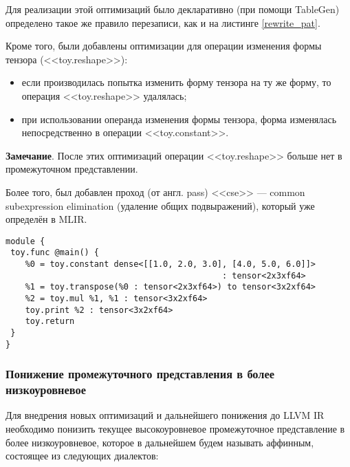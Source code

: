 Для реализации этой оптимизаций было декларативно (при помощи TableGen) определено такое же правило перезаписи, как и на листинге \ref{rewrite_pat}.

Кроме того, были добавлены оптимизации для операции изменения формы тензора (<<toy.reshape>>):

\begin{itemize}
	\item если производилась попытка изменить форму тензора на ту же форму, то операция <<toy.reshape>> удалялась;
	\item при использовании операнда изменения формы тензора, форма изменялась непосредственно в операции <<toy.constant>>.
\end{itemize}

\textbf{Замечание}.
После этих оптимизаций операции <<toy.reshape>> больше нет в промежуточном представлении.

Более того, был добавлен проход (от англ. pass) <<cse>> --- com\-mon subexpression elimination (удаление общих подвыражений), который уже определён в MLIR.

\begin{lstlisting}[caption={Сгенерированное промежуточное представление для программы листинга \ref{toy_ex} после вывода форм и определения вышеупомянутых оптимизаций.}, frame=single]
module {
 toy.func @main() {
    %0 = toy.constant dense<[[1.0, 2.0, 3.0], [4.0, 5.0, 6.0]]>
                                            : tensor<2x3xf64>
    %1 = toy.transpose(%0 : tensor<2x3xf64>) to tensor<3x2xf64>
    %2 = toy.mul %1, %1 : tensor<3x2xf64>
    toy.print %2 : tensor<3x2xf64>
    toy.return
 }
}
\end{lstlisting}

\subsubsection{Понижение промежуточного представления в более низкоуровневое}

Для внедрения новых оптимизаций и дальнейшего понижения до LLVM IR необходимо понизить текущее высокоуровневое промежуточное представление в более низкоуровневое, которое в дальнейшем будем называть аффинным, состоящее из следующих диалектов:

